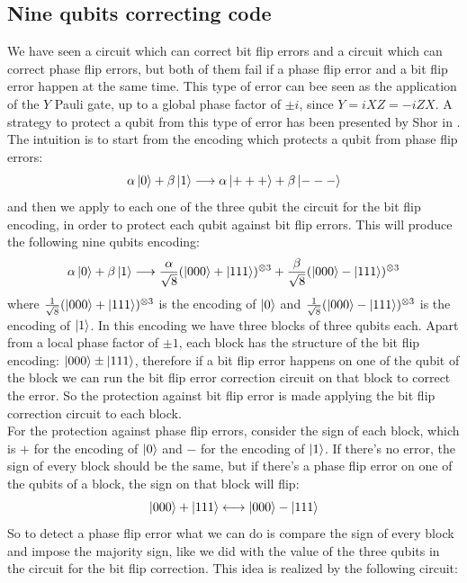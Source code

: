 \documentclass{article}
\begin{document}
	\subsection{Nine qubits correcting code}
	We have seen a circuit which can correct bit flip errors and a circuit which can correct phase flip errors, but both of them fail if a phase flip error and a bit flip error happen at the same time. This type of error can bee seen as the application of the $Y$ Pauli gate, up to a global phase factor of $\pm i$, since $Y = iXZ = -iZX$. A strategy to protect a qubit from this type of error has been presented by Shor in \cite{PhysRevA.52.R2493}. The intuition is to start from the encoding which protects a qubit from phase flip errors:
	\[ \alpha\ket{0} + \beta\ket{1} \longrightarrow \alpha\ket{+++} + \beta\ket{---}\]
	and then we apply to each one of the three qubit the circuit for the bit flip encoding, in order to protect each qubit against bit flip errors. This will produce the following nine qubits encoding:
	\[ \alpha\ket{0} + \beta\ket{1} \longrightarrow \frac{\alpha}{\sqrt{8}}(\ket{000} + \ket{111})^{\otimes 3} + \frac{\beta}{\sqrt{8}} (\ket{000} - \ket{111})^{\otimes 3}\]
	where $\frac{1}{\sqrt{8}}(\ket{000} + \ket{111})^{\otimes 3}$ is the encoding of $\ket{0}$ and $\frac{1}{\sqrt{8}}(\ket{000} - \ket{111})^{\otimes 3}$ is the encoding of $\ket{1}$. In this encoding we have three blocks of three qubits each. Apart from a local phase factor of $\pm1$, each block has the structure of the bit flip encoding: $\ket{000} \pm \ket{111}$, therefore if a bit flip error happens on one of the qubit of the block we can run the bit flip error correction circuit on that block to correct the error. So the protection against bit flip error is made applying the bit flip correction circuit to each block. \\
	For the protection against phase flip errors, consider the sign of each block, which is $+$ for the encoding of $\ket{0}$ and $-$ for the encoding of $\ket{1}$. If there's no error, the sign of every block should be the same, but if there's a phase flip error on one of the qubits of a block, the sign on that block will flip:
	\[ \ket{000} + \ket{111} \longleftrightarrow \ket{000} - \ket{111} \]
	So to detect a phase flip error what we can do is compare the sign of every block and impose the majority sign, like we did with the value of the three qubits in the circuit for the bit flip correction. This idea is realized by the following circuit:
\end{document}
